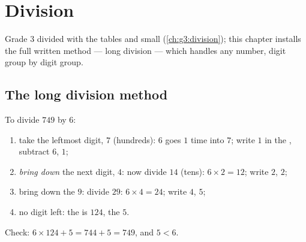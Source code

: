 \chapter{Division}\label{ch:g4:division}

Grade 3 divided with the tables and small 
(\cref{ch:g3:division}); this chapter installs the full written
method --- long division --- which handles any number, digit group by
digit group.

\section{The long division method}

\begin{method}\label{met:g4:division:method}
To divide $749$ by $6$:
\begin{enumerate}
  \item take the leftmost digit, $7$ (hundreds): $6$ goes $1$ time
        into $7$; write $1$ in the , subtract
        $6$,  $1$;
  \item \emph{bring down} the next digit, $4$: now divide $14$
        (tens): $6 \times 2 = 12$; write $2$,  $2$;
  \item bring down the $9$: divide $29$: $6 \times 4 = 24$; write
        $4$,  $5$;
  \item no digit left: the  is $124$, the  $5$.
\end{enumerate}
Check: $6 \times 124 + 5 = 744 + 5 = 749$, and $5 < 6$.
\end{method}

